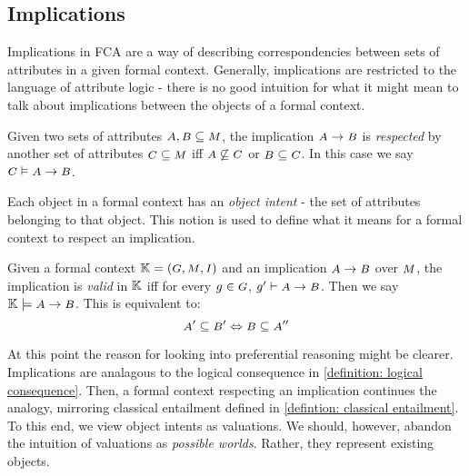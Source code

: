 \subsection{Implications}
\label{section: fca, subsection: implications}
Implications in FCA are a way of describing correspondencies between sets of attributes in a given formal context. Generally, implications are restricted to the language of attribute logic - there is no good intuition for what it might mean to talk about implications between the objects of a formal context.
%
\begin{definition}
    \label{definition: respected implication}
    Given two sets of attributes $\A, \B \subseteq \M$, the implication $\A \rightarrow \B$ is \emph{respected} by another set of attributes $\C \subseteq \M$ iff $\A \not \subseteq \C$ or $\B \subseteq \C$. In this case we say $\C \vDash \A \rightarrow \B$.
\end{definition}
%
Each object in a formal context has an \textit{object intent} - the set of attributes belonging to that object. This notion is used to define what it means for a formal context to respect an implication.
%
\begin{definition}
    \label{definition: valid implication}
    Given a formal context $\FC$ and an implication $\A \rightarrow \B$ over $\M$, the implication is \emph{valid} in $\mathbb{K}$ iff for every $g \in \G$, $g' \vdash \A \rightarrow \B$. Then we say $\K \models \A \rightarrow \B$. This is equivalent to: \[\A' \subseteq \B' \Leftrightarrow \B \subseteq \A''\]
\end{definition}
%
At this point the reason for looking into preferential reasoning might be clearer. Implications are analagous to the logical consequence in \autoref{definition: logical consequence}. Then, a formal context respecting an implication continues the analogy, mirroring classical entailment defined in \autoref{defintion: classical entailment}. To this end, we view object intents as valuations. We should, however, abandon the intuition of valuations as \textit{possible worlds}. Rather, they represent existing objects.